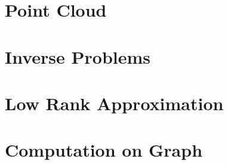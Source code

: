 \section{Point Cloud}

\section{Inverse Problems}

\section{Low Rank Approximation}


\section{Computation on Graph}
